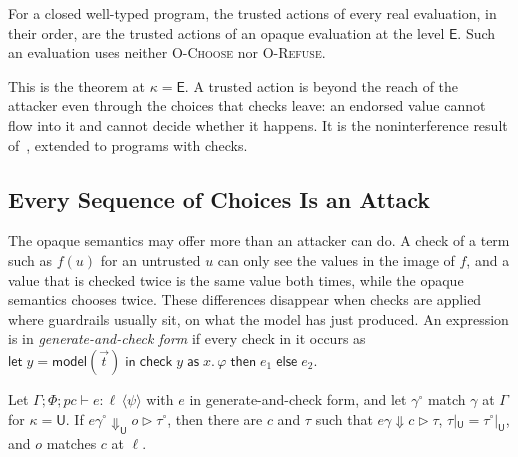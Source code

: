 \documentclass[acmsmall,nonacm,screen]{acmart}
\newcommand{\kw}[1]{\mathsf{#1}}
\newcommand{\E}{\kw{E}}
\newcommand{\U}{\kw{U}}
\newcommand{\model}[1]{\kw{model}(#1)}
\newcommand{\chk}[5]{\kw{check}\;#1\;\kw{as}\;#2.\,#3\;\kw{then}\;#4\;\kw{else}\;#5}
\newcommand{\letin}[2]{\kw{let}\;#1 = #2\;\kw{in}}
\newcommand{\ev}[3]{#1 \Downarrow #2 \triangleright #3}
\newcommand{\oev}[4]{#1 \Downarrow_{#2} #3 \triangleright #4}
\newcommand{\ty}[4]{\Gamma; #1; #2 \vdash #3 : #4}
\newcommand{\post}[1]{\langle #1 \rangle}
\newcommand{\vis}[2]{#1|_{#2}}
\begin{document}
\begin{corollary}
\label{cor:trusted}
For a closed well-typed program, the trusted actions of every real evaluation, in their
order, are the trusted actions of an opaque evaluation at the level $\E$. Such an evaluation
uses neither \textsc{O-Choose} nor \textsc{O-Refuse}.
\end{corollary}

This is the theorem at $\kappa = \E$. A trusted action is beyond the reach of the attacker
even through the choices that checks leave: an endorsed value cannot flow into it and cannot
decide whether it happens. It is the noninterference result of~\cite{tpp5}, extended to
programs with checks.

\subsection{Every Sequence of Choices Is an Attack}

The opaque semantics may offer more than an attacker can do. A check of a term such as
$f(u)$ for an untrusted $u$ can only see the values in the image of $f$, and a value that is
checked twice is the same value both times, while the opaque semantics chooses twice. These
differences disappear when checks are applied where guardrails usually sit, on what the
model has just produced. An expression is in \emph{generate-and-check form} if every check in
it occurs as $\letin{y}{\model{\vec t}}\; \chk{y}{x}{\varphi}{e_1}{e_2}$.

\begin{theorem}
\label{thm:exact}
Let $\ty{\Phi}{pc}{e}{\ell\,\post{\psi}}$ with $e$ in generate-and-check form, and let
$\gamma^\circ$ match $\gamma$ at $\Gamma$ for $\kappa = \U$. If
$\oev{e\gamma^\circ}{\U}{o}{\tau^\circ}$, then there are $c$ and $\tau$ such that
$\ev{e\gamma}{c}{\tau}$, $\vis{\tau}{\U} = \vis{\tau^\circ}{\U}$, and $o$ matches $c$ at
$\ell$.
\end{theorem}
\end{document}

